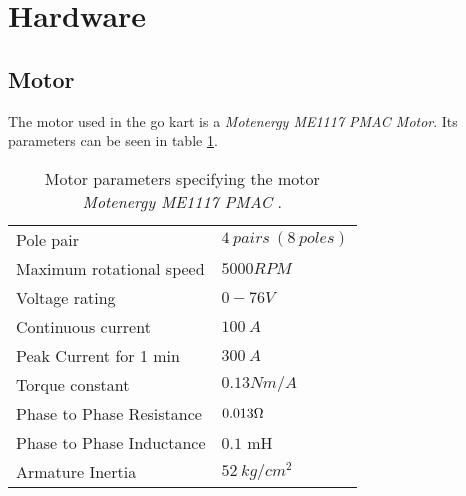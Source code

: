 \section{Hardware}
\label{sec:hardware}

\subsection{Motor}
The motor used in the go kart is a \textit{Motenergy ME1117 PMAC Motor}. Its parameters can be seen in table \ref{Motor_parameters_list}. 

\begin{table} [H]
    \centering
    \begin{tabular}{|l|l|} \cline{1-2}
        Pole pair                   & $4\ pairs\ (8\ poles)$        \\ \cline{1-2}
        Maximum rotational speed    & $5000 RPM$                    \\ \cline{1-2}
        Voltage rating              & $0-76 V$                      \\ \cline{1-2}
        Continuous current          & $100\ A$                      \\ \cline{1-2}
        Peak Current for 1 min      & $300\ A$                      \\ \cline{1-2}
        Torque constant             & $0.13 Nm/A$                   \\ \cline{1-2}
        Phase to Phase Resistance   & $0.013\ohm$                   \\ \cline{1-2}
        Phase to Phase Inductance   & $0.1$ mH                      \\ \cline{1-2}
        Armature Inertia            & $52\ kg/cm^2$                 \\ \cline{1-2}
    \end{tabular} \\
    \caption{Motor parameters specifying the motor \textit{Motenergy ME1117 PMAC} \cite{Motor_Parameters}.}
    \label{Motor_parameters_list}
\end{table} 




